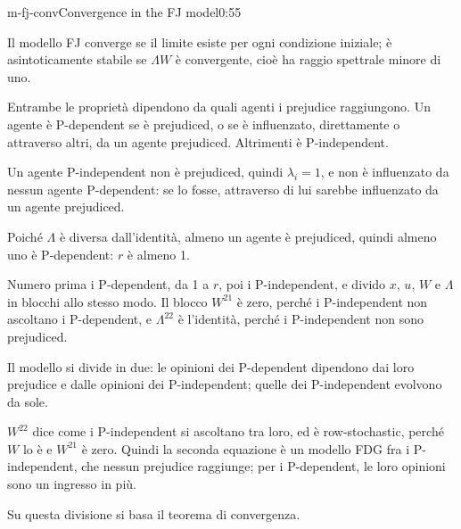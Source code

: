 \begin{slide}{m-fj-conv}{Convergence in the FJ model}{0:55}
  \begin{discorso}
    \item Il modello FJ converge se il limite esiste per ogni condizione iniziale; è asintoticamente stabile se $\Lambda W$ è convergente, cioè ha raggio spettrale minore di uno.
    \item Entrambe le proprietà dipendono da quali agenti i prejudice raggiungono. Un agente è P-dependent se è prejudiced, o se è influenzato, direttamente o attraverso altri, da un agente prejudiced. Altrimenti è P-independent.
    \item Un agente P-independent non è prejudiced, quindi $\lambda_i=1$, e non è influenzato da nessun agente P-dependent: se lo fosse, attraverso di lui sarebbe influenzato da un agente prejudiced.
    \item Poiché $\Lambda$ è diversa dall'identità, almeno un agente è prejudiced, quindi almeno uno è P-dependent: $r$ è almeno 1.
    \item Numero prima i P-dependent, da 1 a $r$, poi i P-independent, e divido $x$, $u$, $W$ e $\Lambda$ in blocchi allo stesso modo. Il blocco $W^{21}$ è zero, perché i P-independent non ascoltano i P-dependent, e $\Lambda^{22}$ è l'identità, perché i P-independent non sono prejudiced.
    \item Il modello si divide in due: le opinioni dei P-dependent dipendono dai loro prejudice e dalle opinioni dei P-independent; quelle dei P-independent evolvono da sole.
    \item $W^{22}$ dice come i P-independent si ascoltano tra loro, ed è row-stochastic, perché $W$ lo è e $W^{21}$ è zero. Quindi la seconda equazione è un modello FDG fra i P-independent, che nessun prejudice raggiunge; per i P-dependent, le loro opinioni sono un ingresso in più.
    \item Su questa divisione si basa il teorema di convergenza.
  \end{discorso}
\end{slide}

